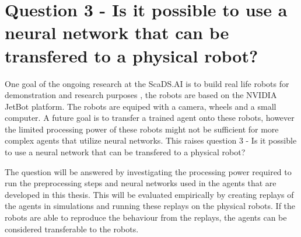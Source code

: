 \section{Question 3 - Is it possible to use a neural network that can be transfered to a physical robot?}

One goal of the ongoing research at the ScaDS.AI is to build real life robots for demonstration and research purposes \textcite{merlin_flach}, the robots are based on the NVIDIA JetBot platform. The robots are equiped with a camera, wheels and a small computer. A future goal is to transfer a trained agent onto these robots, however the limited processing power of these robots might not be sufficient for more complex agents that utilize neural networks. This raises question 3 - Is it possible to use a neural network that can be transfered to a physical robot?


The question will be answered by investigating the processing power required to run the preprocessing steps and neural networks used in the agents that are developed in this thesis. This will be evaluated empirically by creating replays of the agents in simulations and running these replays on the physical robots. If the robots are able to reproduce the behaviour from the replays, the agents can be considered transferable to the robots.

